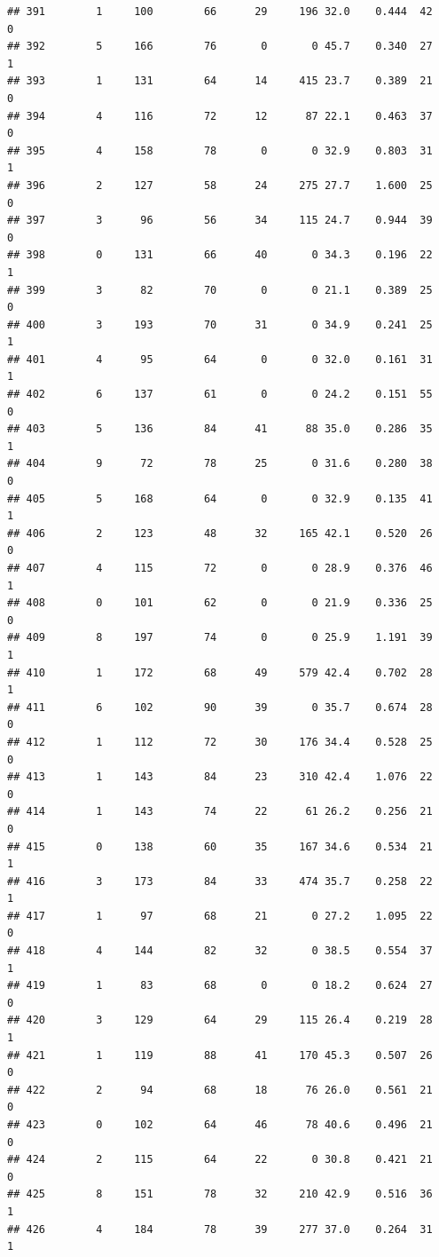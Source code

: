 \documentclass[11pt, a4paper]{article}\usepackage[]{graphicx}\usepackage[]{xcolor}
\makeatletter
\newenvironment{kframe}{%
 \def\at@end@of@kframe{}%
 \ifinner\ifhmode%
  \def\at@end@of@kframe{\end{minipage}}%
  \begin{minipage}{\columnwidth}%
 \fi\fi%
 \def\FrameCommand##1{\hskip\@totalleftmargin \hskip-\fboxsep
 \colorbox{shadecolor}{##1}\hskip-\fboxsep
     \hskip-\linewidth \hskip-\@totalleftmargin \hskip\columnwidth}%
 \MakeFramed {\advance\hsize-\width
   \@totalleftmargin\z@ \linewidth\hsize
   \@setminipage}}%
 {\par\unskip\endMakeFramed%
 \at@end@of@kframe}
\newenvironment{knitrout}{}{} %
\makeatother
\begin{document}
\begin{knitrout}
\begin{kframe}
\begin{verbatim}
## 391        1     100        66      29     196 32.0    0.444  42    0
## 392        5     166        76       0       0 45.7    0.340  27    1
## 393        1     131        64      14     415 23.7    0.389  21    0
## 394        4     116        72      12      87 22.1    0.463  37    0
## 395        4     158        78       0       0 32.9    0.803  31    1
## 396        2     127        58      24     275 27.7    1.600  25    0
## 397        3      96        56      34     115 24.7    0.944  39    0
## 398        0     131        66      40       0 34.3    0.196  22    1
## 399        3      82        70       0       0 21.1    0.389  25    0
## 400        3     193        70      31       0 34.9    0.241  25    1
## 401        4      95        64       0       0 32.0    0.161  31    1
## 402        6     137        61       0       0 24.2    0.151  55    0
## 403        5     136        84      41      88 35.0    0.286  35    1
## 404        9      72        78      25       0 31.6    0.280  38    0
## 405        5     168        64       0       0 32.9    0.135  41    1
## 406        2     123        48      32     165 42.1    0.520  26    0
## 407        4     115        72       0       0 28.9    0.376  46    1
## 408        0     101        62       0       0 21.9    0.336  25    0
## 409        8     197        74       0       0 25.9    1.191  39    1
## 410        1     172        68      49     579 42.4    0.702  28    1
## 411        6     102        90      39       0 35.7    0.674  28    0
## 412        1     112        72      30     176 34.4    0.528  25    0
## 413        1     143        84      23     310 42.4    1.076  22    0
## 414        1     143        74      22      61 26.2    0.256  21    0
## 415        0     138        60      35     167 34.6    0.534  21    1
## 416        3     173        84      33     474 35.7    0.258  22    1
## 417        1      97        68      21       0 27.2    1.095  22    0
## 418        4     144        82      32       0 38.5    0.554  37    1
## 419        1      83        68       0       0 18.2    0.624  27    0
## 420        3     129        64      29     115 26.4    0.219  28    1
## 421        1     119        88      41     170 45.3    0.507  26    0
## 422        2      94        68      18      76 26.0    0.561  21    0
## 423        0     102        64      46      78 40.6    0.496  21    0
## 424        2     115        64      22       0 30.8    0.421  21    0
## 425        8     151        78      32     210 42.9    0.516  36    1
## 426        4     184        78      39     277 37.0    0.264  31    1

\end{verbatim}
\end{kframe}
\end{knitrout}
\end{document}
